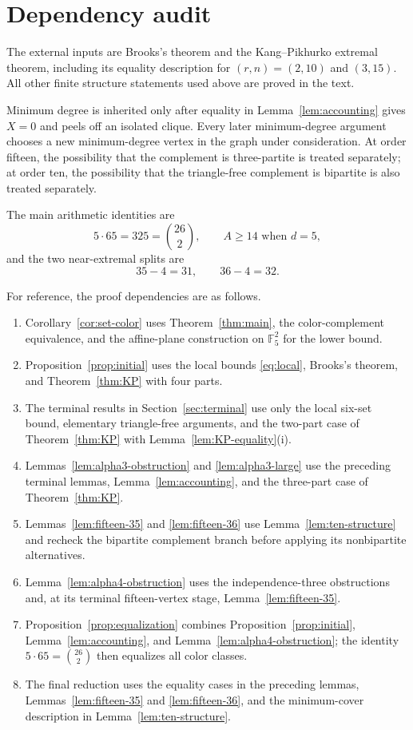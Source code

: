 \documentclass[11pt,reqno,a4paper]{amsart}
\theoremstyle{definition}
\theoremstyle{remark}
\newcommand{\Ffive}{\mathbb{F}_{5}}
\begin{document}
\appendix
\section{Dependency audit}

The external inputs are Brooks's theorem and the Kang--Pikhurko extremal
theorem, including its equality description for $(r,n)=(2,10)$ and
$(3,15)$.  All other finite structure statements used above are proved in
the text.

Minimum degree is inherited only after equality in
Lemma~\ref{lem:accounting} gives $X=0$ and peels off an isolated clique.
Every later minimum-degree argument chooses a new minimum-degree vertex in
the graph under consideration.  At order fifteen, the possibility that the
complement is three-partite is treated separately; at order ten, the
possibility that the triangle-free complement is bipartite is also treated
separately.

The main arithmetic identities are
\[
  5\cdot65=325=\binom{26}{2},
  \qquad A\geq14\text{ when }d=5,
\]
and the two near-extremal splits are
\[
  35-4=31,
  \qquad 36-4=32.
\]

For reference, the proof dependencies are as follows.
\begin{enumerate}[label=\textup{D\arabic*.},leftmargin=2.8em]
\item Corollary~\ref{cor:set-color} uses Theorem~\ref{thm:main}, the
color-complement equivalence, and the affine-plane construction on
$\Ffive^2$ for the lower bound.
\item Proposition~\ref{prop:initial} uses the local bounds
\eqref{eq:local}, Brooks's theorem, and Theorem~\ref{thm:KP} with four
parts.
\item The terminal results in Section~\ref{sec:terminal} use only the
local six-set bound, elementary triangle-free arguments, and the two-part
case of Theorem~\ref{thm:KP} with Lemma~\ref{lem:KP-equality}(i).
\item Lemmas~\ref{lem:alpha3-obstruction} and
\ref{lem:alpha3-large} use the preceding terminal lemmas,
Lemma~\ref{lem:accounting}, and the three-part case of
Theorem~\ref{thm:KP}.
\item Lemmas~\ref{lem:fifteen-35} and \ref{lem:fifteen-36} use
Lemma~\ref{lem:ten-structure} and recheck the bipartite complement branch
before applying its nonbipartite alternatives.
\item Lemma~\ref{lem:alpha4-obstruction} uses the independence-three
obstructions and, at its terminal fifteen-vertex stage,
Lemma~\ref{lem:fifteen-35}.
\item Proposition~\ref{prop:equalization} combines
Proposition~\ref{prop:initial}, Lemma~\ref{lem:accounting}, and
Lemma~\ref{lem:alpha4-obstruction}; the identity
$5\cdot65=\binom{26}{2}$ then equalizes all color classes.
\item The final reduction uses the equality cases in the preceding
lemmas, Lemmas~\ref{lem:fifteen-35} and \ref{lem:fifteen-36}, and the
minimum-cover description in Lemma~\ref{lem:ten-structure}.
\end{enumerate}



\end{document}
